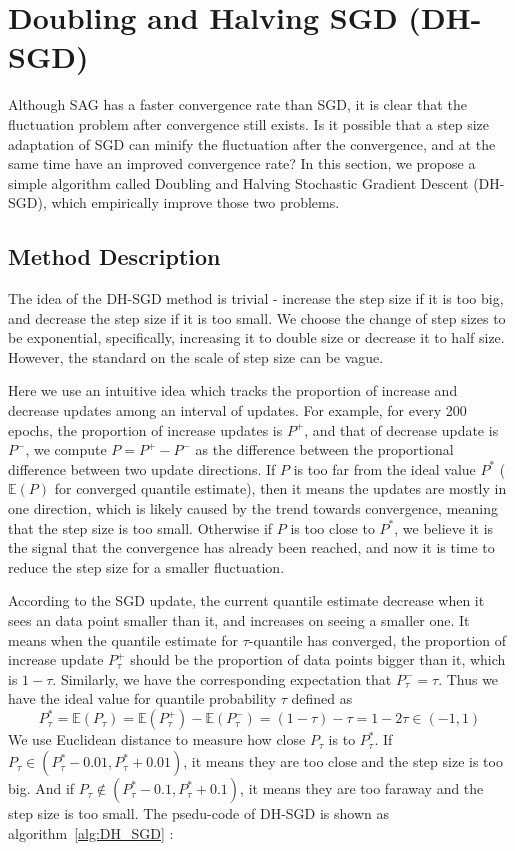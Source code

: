\section{Doubling and Halving SGD (DH-SGD)}
\label{sec: DH_SGD}

Although SAG has a faster convergence rate than SGD, it is clear that the fluctuation problem after convergence still exists. Is it possible that a step size adaptation of SGD can minify the fluctuation after the convergence, and at the same time have an improved convergence rate? In this section, we propose a simple algorithm called Doubling and Halving Stochastic Gradient Descent (DH-SGD), which empirically improve those two problems.

\subsection{Method Description}

The idea of the DH-SGD method is trivial - increase the step size if it is too big, and decrease the step size if it is too small. We choose the change of step sizes to be exponential, specifically, increasing it to double size or decrease it to half size. However, the standard on the scale of step size can be vague. 

Here we use an intuitive idea which tracks the proportion of increase and decrease updates among an interval of updates. For example, for every 200 epochs, the proportion of increase updates is $P^+$, and that of decrease update is $P^-$, we compute $P = P^+ - P^-$ as the difference between the proportional difference between two update directions. If $P$ is too far from the ideal value $P^*$ ($\mathbb{E}(P)$ for converged quantile estimate), then it means the updates are mostly in one direction, which is likely caused by the trend towards convergence, meaning that the step size is too small. Otherwise if $P$ is too close to $P^*$, we believe it is the signal that the convergence has already been reached, and now it is time to reduce the step size for a smaller fluctuation. 

According to the SGD update, the current quantile estimate decrease when it sees an data point smaller than it, and increases on seeing a smaller one.
It means when the quantile estimate for $\tau$-quantile has converged, the proportion of increase update $P^+_\tau$ should be the proportion of data points bigger than it, which is $1-\tau$. Similarly, we have the corresponding expectation that $P^-_\tau = \tau$.
Thus we have the ideal value for quantile probability $\tau$ defined as
\begin{equation}
    P^*_\tau = \mathbb{E}(P_\tau) = \mathbb{E}(P^+_\tau) - \mathbb{E}(P^-_\tau) = (1-\tau) - \tau = 1 - 2\tau \in (-1, 1)
\end{equation}
We use Euclidean distance to measure how close $P_\tau$ is to $P_\tau^*$. If $P_\tau \in (P^*_\tau- 0.01, P^*_\tau+ 0.01)$, it means they are too close and the step size is too big. And if $P_\tau \not\in (P^*_\tau- 0.1, P^*_\tau+ 0.1)$, it means they are too faraway and the step size is too small. 
The psedu-code of DH-SGD is shown as algorithm~\ref{alg:DH_SGD} :

